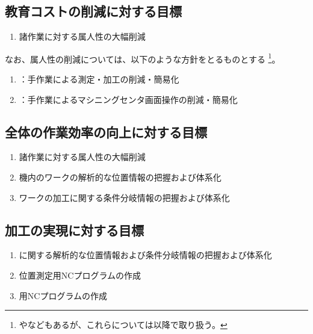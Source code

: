 \subsection{教育コストの削減に対する目標}
\begin{enumerate}[label=\sarrow]
\item 諸作業に対する属人性の大幅削減
\end{enumerate}
なお、属人性の削減については、以下のような方針をとるものとする
\footnote{やなどもあるが、これらについては以降で取り扱う。}。
\begin{enumerate}[label=\sarrow]
\item {}：手作業による測定・加工の削減・簡易化
\item {}：手作業によるマシニングセンタ画面操作の削減・簡易化
\end{enumerate}


\subsection{全体の作業効率の向上に対する目標}
\begin{enumerate}[label=\sarrow]
\item 諸作業に対する属人性の大幅削減
\item 機内のワークの解析的な位置情報の把握および体系化
\item ワークの加工に関する条件分岐情報の把握および体系化
\end{enumerate}


\subsection{\Dimple 加工の実現に対する目標}
\begin{enumerate}[label=\sarrow]
\item \Dimple に関する解析的な位置情報および条件分岐情報の把握および体系化
\item \Dimple 位置測定用NCプログラムの作成
\item \DimpleMilling 用NCプログラムの作成
\end{enumerate}


